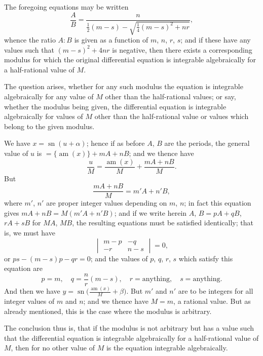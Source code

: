\documentclass[11pt,a4paper]{article}
\theoremstyle{plain}
\theoremstyle{definition}
\DeclareMathOperator{\sn}{sn}
\DeclareMathOperator{\am}{am}
\begin{document}
The foregoing equations may be written
\[
\frac{A}{B} = \frac{n}{\frac{1}{2}(m - s) - \sqrt{\frac{1}{4}(m - s)^2 + nr}},
\]
whence the ratio $A : B$ is given as a function of $m$, $n$, $r$, $s$; and if these have any values such that $(m - s)^2 + 4nr$ is negative, then there exists a corresponding modulus for which the original differential equation is integrable algebraically for a half-rational value of $M$.

The question arises, whether for any such modulus the equation is integrable algebraically for any value of $M$ other than the half-rational values; or say, whether the modulus being given, the differential equation is integrable algebraically for values of $M$ other than the half-rational value or values which belong to the given modulus.

We have $x = \sn(u + \alpha)$; hence if as before $A$, $B$ are the periods, the general value of $u$ is $= \{\am(x)\} + mA + nB$; and we thence have
\[
\frac{u}{M} = \frac{\am(x)}{M} + \frac{mA + nB}{M}.
\]
But
\[
\frac{mA + nB}{M} = m'A + n'B,
\]
where $m'$, $n'$ are proper integer values depending on $m$, $n$; in fact this equation gives $mA + nB = M(m'A + n'B)$; and if we write herein $A$, $B = pA + qB$, $rA + sB$ for $MA$, $MB$, the resulting equations must be satisfied identically; that is, we must have
\[
\begin{vmatrix} m - p & -q \\ -r & n - s \end{vmatrix} = 0,
\]
or $ps - (m - s)p - qr = 0$; and the values of $p$, $q$, $r$, $s$ which satisfy this equation are
\[
p = m, \quad q = \frac{n}{r}(m - s), \quad r = \text{anything}, \quad s = \text{anything}.
\]
And then we have $y = \sn\bigl(\frac{\am(x)}{M} + \beta\bigr)$. But $m'$ and $n'$ are to be integers for all integer values of $m$ and $n$; and we thence have $M = m$, a rational value. But as already mentioned, this is the case where the modulus is arbitrary.

The conclusion thus is, that if the modulus is not arbitrary but has a value such that the differential equation is integrable algebraically for a half-rational value of $M$, then for no other value of $M$ is the equation integrable algebraically.

\begin{flushright}
\end{flushright}

\newpage
\end{document}
